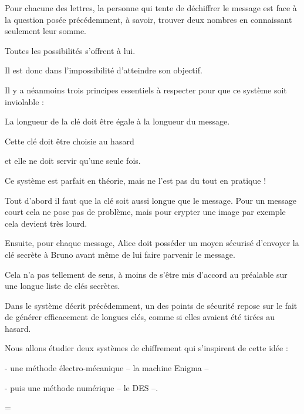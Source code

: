 Pour chacune des lettres, la personne qui tente de déchiffrer le message est 
face à la question posée précédemment, à savoir, 
trouver deux nombres en connaissant seulement leur somme.

Toutes les possibilités s'offrent à lui.

Il est donc dans l'impossibilité d'atteindre son objectif.

\change

Il y a néanmoins trois principes essentiels à respecter pour que ce système soit inviolable :

\change

La longueur de la clé doit être  égale à la longueur du message.
  
\change

Cette clé doit être choisie au hasard
  
\change

et elle ne doit servir qu'une seule fois.

\change

Ce système est parfait en théorie, mais ne l'est pas du tout en pratique !

\change

Tout d'abord il faut que la clé soit aussi longue que le message. Pour un message 
court cela ne pose pas de problème, mais pour crypter une image par exemple cela devient très lourd.

\change

Ensuite, pour chaque message, Alice doit posséder un moyen sécurisé d'envoyer la clé secrète à Bruno 
avant même de lui faire parvenir le message. 

Cela n'a pas tellement de sens, à moins de s'être mis d'accord au préalable sur une longue liste de clés secrètes.



\diapo

Dans le système décrit précédemment, un des points de sécurité repose sur le fait de générer efficacement de longues clés, comme si elles avaient
été tirées au hasard. 

Nous allons étudier deux systèmes de chiffrement qui s'inspirent de cette idée : 

- une méthode électro-mécanique -- la machine Enigma --

- puis une méthode numérique -- le DES --.

\change

=

